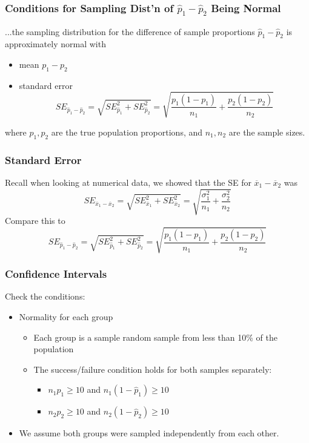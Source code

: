 \documentclass[handout]{beamer}
\newcommand{\blue}[1]{\textcolor{blue2}{#1}}
\newcommand{\xbar}{\overline{x}}
\newcommand{\phat}{\widehat{p}}
\begin{document}
\begin{frame}[fragile]
\frametitle{Conditions for Sampling Dist'n of $\phat_1-\phat_2$ Being Normal}

...the sampling distribution for the difference of sample proportions $\phat_1 - \phat_2$ is approximately normal with
\begin{itemize}
\pause\item mean $p_1 - p_2$
\pause\item standard error
\[
SE_{\phat_1 - \phat_2} = \sqrt{SE_{\phat_1}^2 + SE_{\phat_2}^2} = 
\sqrt{\frac{p_1(1-p_1)}{n_1} + \frac{p_2(1-p_2)}{n_2}}
\]
\end{itemize}
where $p_1, p_2$ are the true population proportions, and $n_1,n_2$ are the sample sizes.


\end{frame}


\begin{frame}[fragile]
\frametitle{Standard Error}

Recall when looking at numerical data, we showed that the SE for $\xbar_1-\xbar_2$ was
\[
SE_{\xbar_1-\xbar_2} = \sqrt{SE_{\xbar_1}^2 + SE_{\xbar_2}^2} = 
\sqrt{\frac{\sigma_1^2}{n_1} + \frac{\sigma_2^2}{n_2}}
\]
\pause Compare this to 
\[
SE_{\phat_1 - \phat_2} = \sqrt{SE_{\phat_1}^2 + SE_{\phat_2}^2} = 
\sqrt{\frac{p_1(1-p_1)}{n_1} + \frac{p_2(1-p_2)}{n_2}}
\]

\end{frame}


\begin{frame}[fragile]
\frametitle{Confidence Intervals}
Check the conditions:
\begin{itemize}
\pause\item Normality for each group
\begin{itemize}
\pause\item Each group is a sample random sample from less than 10\% of the population
\pause\item The success/failure condition holds for \blue{both} samples separately:
\begin{itemize}
\item $n_1\phat_1 \geq 10$ and $n_1(1-\phat_1) \geq 10$
\item $n_2\phat_2 \geq 10$ and $n_2(1-\phat_2) \geq 10$
\end{itemize}
\end{itemize}
\pause\item We assume both groups were sampled independently from each other.  
\end{itemize}

\end{frame}
\end{document}
